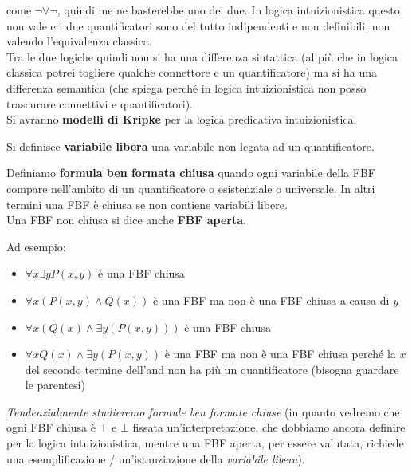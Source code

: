 \documentclass[a4paper,12pt, oneside]{book}
\begin{document}
come $\neg\forall\neg$, quindi me ne basterebbe uno dei due. In logica
intuizionistica questo non vale e i due quantificatori sono del tutto
indipendenti e non definibili, non valendo l'equivalenza classica.\\
Tra le due logiche quindi non si ha una differenza sintattica (al più che in
logica classica potrei togliere qualche connettore e un quantificatore) ma si ha
una differenza semantica (che spiega perché in logica intuizionistica non posso
trascurare connettivi e quantificatori).\\
Si avranno \textbf{modelli di Kripke} per la logica predicativa intuizionistica.
\begin{definizione}
  Si definisce \textbf{variabile libera} una variabile non legata ad un
  quantificatore. 
\end{definizione}
\begin{definizione}
  Definiamo \textbf{formula ben formata chiusa} quando ogni variabile della FBF
  compare nell'ambito di un quantificatore o esistenziale o universale. In altri
  termini una FBF è chiusa se non contiene variabili libere.\\
  Una FBF non chiusa si dice anche \textbf{FBF aperta}.
\end{definizione}
\begin{esempio}
  Ad esempio:
  \begin{itemize}
    \item $\forall x\exists yP(x,y)$ è una FBF chiusa
    \item $\forall x(P(x, y)\land Q(x))$ è una FBF ma non è una FBF chiusa a
    causa di $y$ 
    \item $\forall x(Q(x)\land \exists y(P(x,y)))$ è una FBF chiusa
     \item $\forall xQ(x)\land \exists y(P(x,y))$ è una FBF ma non è una FBF
     chiusa perché la $x$ del secondo termine dell'and non ha più un
     quantificatore (bisogna guardare le parentesi)
  \end{itemize}
\end{esempio}
\textit{Tendenzialmente studieremo formule ben formate chiuse} (in quanto
vedremo che ogni FBF chiusa è $\top$ e $\bot$ fissata un'interpretazione, che
dobbiamo ancora definire per la logica intuizionistica, mentre
una FBF aperta, per essere valutata, richiede una esemplificazione /
un'istanziazione della \textit{variabile libera}).
\end{document}
